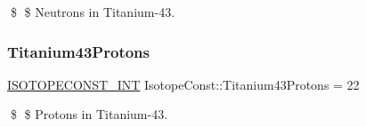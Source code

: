 \$ \$ Neutrons in Titanium-\/43. \mbox{\label{group___isotope_const-_titanium-_ti43_ga46e1609a1fa23f30b9dc2b887ee11adc}} 
\subsubsection{\texorpdfstring{Titanium43\+Protons}{Titanium43Protons}}
{\footnotesize\ttfamily \mbox{\hyperlink{group___isotope_const-_macros_ga5f18360b3e99483a35c32d789e62621c}{I\+S\+O\+T\+O\+P\+E\+C\+O\+N\+S\+T\+\_\+\+I\+NT}} Isotope\+Const\+::\+Titanium43\+Protons = 22}

\$ \$ Protons in Titanium-\/43. 